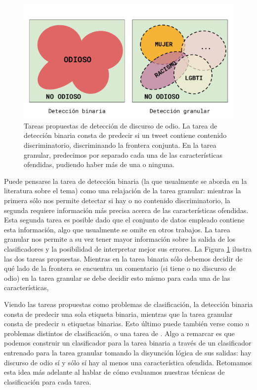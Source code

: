 \begin{figure}[t]
    \centering
    \includegraphics[width=\textwidth]{img/06/hate_detection_tasks.pdf}
    \caption{Tareas propuestas de detección de discurso de odio. La tarea de detección binaria consta de predecir si un tweet contiene contenido discriminatorio, discriminando la frontera conjunta. En la tarea granular, predecimos por separado cada una de las características ofendidas, pudiendo haber más de una o ninguna.}
    \label{fig:hate_detection_tasks}
\end{figure}



Puede pensarse la tarea de detección binaria (la que usualmente se aborda en la literatura sobre el tema) como una relajación de la tarea granular: mientras la primera sólo nos permite detectar si hay o no contenido discriminatorio, la segunda requiere información más precisa acerca de las características ofendidas. Esta segunda tarea es posible dado que el conjunto de datos empleado contiene esta información, algo que usualmente se omite en otros trabajos. La tarea granular nos permite a su vez tener mayor información sobre la salida de los clasificadores y la posibilidad de interpretar mejor sus errores. La Figura \ref{fig:hate_detection_tasks} ilustra las dos tareas propuestas. Mientras en la tarea binaria sólo debemos decidir de qué lado de la frontera se encuentra un comentario (si tiene o no discurso de odio) en la tarea granular se debe decidir esto mismo para cada una de las características,


Viendo las tareas propuestas como problemas de clasificación, la detección binaria consta de predecir una sola etiqueta binaria, mientras que la tarea granular consta de predecir $n$ etiquetas binarias. Esto último puede también verse como $n$ problemas distintos de clasificación, o una tarea de . Algo a remarcar es que podemos construir un clasificador para la tarea binaria a través de un clasificador entrenado para la tarea granular tomando la disyunción lógica de sus salidas: hay discurso de odio sí y sólo sí hay al menos una característica ofendida. Retomamos esta idea más adelante al hablar de cómo evaluamos nuestras técnicas de clasificación para cada tarea.


